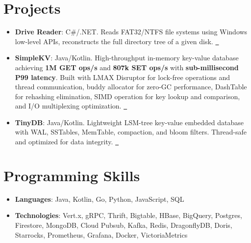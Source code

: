 \documentclass[letterpaper,11pt]{article}
\newcommand{\resumeItem}[2]{
    \item\small{
        \textbf{#1}{: #2 \vspace{-2pt}}
    }
}
\newcommand{\resumeSubItem}[2]{\resumeItem{#1}{#2}\vspace{-4pt}}
\newcommand{\resumeSubHeadingListStart}{\begin{itemize}[leftmargin=*]}
\newcommand{\resumeSubHeadingListEnd}{\end{itemize}}
\begin{document}
    \section{Projects}\label{sec:projects}
    \resumeSubHeadingListStart
    \resumeSubItem{Drive Reader}{C\#/.NET. Reads FAT32/NTFS file systems using Windows low-level APIs, reconstructs the full directory tree of a given disk. \href{https://github.com/phuchienngo/DriveReader}{\faGithub\ }}
    \resumeSubItem{SimpleKV}{Java/Kotlin. High-throughput in-memory key-value database achieving \textbf{1M GET ops/s} and \textbf{807k SET ops/s} with \textbf{sub-millisecond P99 latency}. Built with LMAX Disruptor for lock-free operations and thread communication, buddy allocator for zero-GC performance, DashTable for rehashing elimination, SIMD operation for key lookup and comparison, and I/O multiplexing optimization. \href{https://github.com/phuchienngo/simplekv}{\faGithub\ }}
    \resumeSubItem{TinyDB}{Java/Kotlin. Lightweight LSM-tree key-value embedded database with WAL, SSTables, MemTable, compaction, and bloom filters. Thread-safe and optimized for data integrity. \href{https://github.com/phuchienngo/tinydb}{\faGithub\ }}
    \resumeSubHeadingListEnd

%
    \section{Programming Skills}\label{sec:programming-skills}
    \resumeSubHeadingListStart
    \resumeSubItem{Languages}
    {Java, Kotlin, Go, Python, JavaScript, SQL}
    \resumeSubItem{Technologies}
    {Vert.x, gRPC, Thrift, Bigtable, HBase, BigQuery, Postgres, Firestore, MongoDB, Cloud Pubsub, Kafka, Redis, DragonflyDB, Doris, Starrocks, Prometheus, Grafana, Docker, VictoriaMetrics}
    \resumeSubHeadingListEnd


\end{document}
